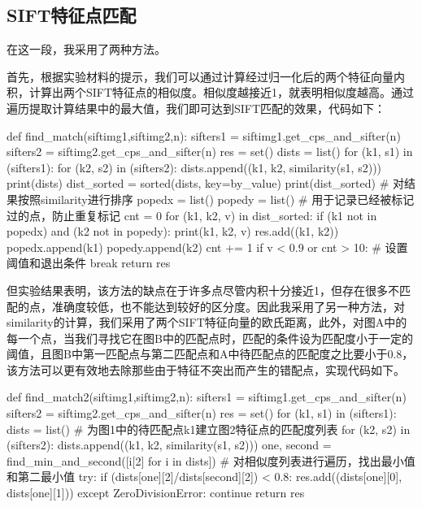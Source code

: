 \documentclass{article}
\begin{document}
\subsection{SIFT特征点匹配}

在这一段，我采用了两种方法。

首先，根据实验材料的提示，我们可以通过计算经过归一化后的两个特征向量内积，计算出两个SIFT特征点的相似度。相似度越接近1，就表明相似度越高。通过遍历提取计算结果中的最大值，我们即可达到SIFT匹配的效果，代码如下：
\begin{python}
def find_match(siftimg1,siftimg2,n):
    sifters1 = siftimg1.get_cps_and_sifter(n)
    sifters2 = siftimg2.get_cps_and_sifter(n)
    res = set()
    dists = list()
    for (k1, s1) in (sifters1):
        for (k2, s2) in (sifters2):
            dists.append((k1, k2, similarity(s1, s2)))
    print(dists)
    dist_sorted = sorted(dists, key=by_value)
    print(dist_sorted)  # 对结果按照similarity进行排序
    popedx = list()
    popedy = list()     # 用于记录已经被标记过的点，防止重复标记
    cnt = 0
    for (k1, k2, v) in dist_sorted:
        if (k1 not in popedx) and (k2 not in popedy):
            print(k1, k2, v)
            res.add((k1, k2))
            popedx.append(k1)
            popedy.append(k2)
            cnt += 1
        if v < 0.9 or cnt > 10:    # 设置阈值和退出条件
            break
    return res
\end{python}


但实验结果表明，该方法的缺点在于许多点尽管内积十分接近1，但存在很多不匹配的点，准确度较低，也不能达到较好的区分度。因此我采用了另一种方法，对similarity的计算，我们采用了两个SIFT特征向量的欧氏距离，此外，对图A中的每一个点，当我们寻找它在图B中的匹配点时，匹配的条件设为匹配度小于一定的阈值，且图B中第一匹配点与第二匹配点和A中待匹配点的匹配度之比要小于0.8，该方法可以更有效地去除那些由于特征不突出而产生的错配点，实现代码如下。

\begin{python}
def find_match2(siftimg1,siftimg2,n):
    sifters1 = siftimg1.get_cps_and_sifter(n)
    sifters2 = siftimg2.get_cps_and_sifter(n)
    res = set()
    for (k1, s1) in (sifters1):
        dists = list()   # 为图1中的待匹配点k1建立图2特征点的匹配度列表
        for (k2, s2) in (sifters2):
            dists.append((k1, k2, similarity(s1, s2)))
        one, second = find_min_and_second([i[2] for i in dists]) 
        # 对相似度列表进行遍历，找出最小值和第二最小值
        try:
            if (dists[one][2]/dists[second][2]) < 0.8:
                res.add((dists[one][0], dists[one][1]))
        except ZeroDivisionError:
            continue
    return res
\end{python}
\end{document}
